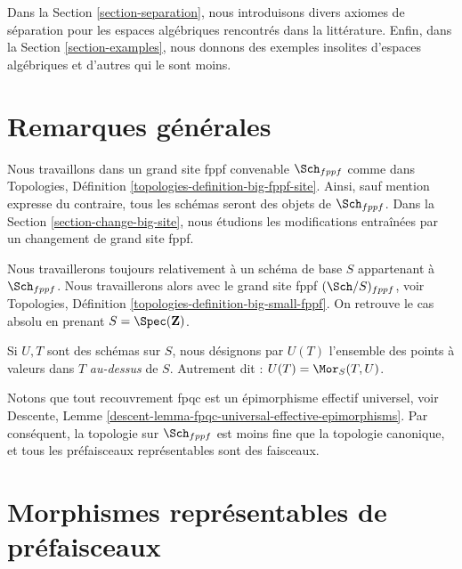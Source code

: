 \medskip\noindent
Dans la Section \ref{section-separation}, nous introduisons divers axiomes
de séparation pour les espaces algébriques rencontrés dans la littérature.
Enfin, dans la Section \ref{section-examples},
nous donnons des exemples insolites d'espaces algébriques et d'autres qui le sont moins.






\section{Remarques générales}
\label{section-general}

\noindent
Nous travaillons dans un grand site fppf convenable $\Sch_{fppf}$
comme dans Topologies, Définition \ref{topologies-definition-big-fppf-site}.
Ainsi, sauf mention expresse du contraire, tous les schémas seront des objets
de $\Sch_{fppf}$.
Dans la Section \ref{section-change-big-site}, nous étudions les modifications
entraînées par un changement de grand site fppf.

\medskip\noindent
Nous travaillerons toujours relativement à un schéma de base $S$ appartenant à $\Sch_{fppf}$.
Nous travaillerons alors avec le grand site fppf $(\Sch/S)_{fppf}$,
voir Topologies, Définition \ref{topologies-definition-big-small-fppf}.
On retrouve le cas absolu en prenant
$S = \Spec(\mathbf{Z})$.

\medskip\noindent
Si $U, T$ sont des schémas sur $S$, nous désignons
par $U(T)$ l'ensemble des points à valeurs dans $T$ {\it au-dessus} de $S$.
Autrement dit : $U(T) = \Mor_S(T, U)$.

\medskip\noindent
Notons que tout recouvrement fpqc est un épimorphisme effectif universel, voir
Descente, Lemme \ref{descent-lemma-fpqc-universal-effective-epimorphisms}.
Par conséquent, la topologie sur $\Sch_{fppf}$
est moins fine que la topologie canonique, et tous les préfaisceaux représentables
sont des faisceaux.







\section{Morphismes représentables de préfaisceaux}
\label{section-representable}

